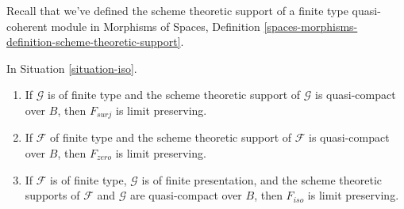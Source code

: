 \noindent
Recall that we've defined the scheme theoretic support of a finite
type quasi-coherent module in Morphisms of Spaces, Definition
\ref{spaces-morphisms-definition-scheme-theoretic-support}.

\begin{lemma}
\label{lemma-iso-limits}
In Situation \ref{situation-iso}.
\begin{enumerate}
\item If $\mathcal{G}$ is of finite type and the scheme theoretic support
of $\mathcal{G}$ is quasi-compact over $B$, then $F_{surj}$ is limit
preserving.
\item If $\mathcal{F}$ of finite type and the scheme theoretic support
of $\mathcal{F}$ is quasi-compact over $B$, then
$F_{zero}$ is limit preserving.
\item If $\mathcal{F}$ is of finite type,
$\mathcal{G}$ is of finite presentation, and the
scheme theoretic supports of $\mathcal{F}$ and $\mathcal{G}$ are
quasi-compact over $B$, then $F_{iso}$ is limit preserving.
\end{enumerate}
\end{lemma}

